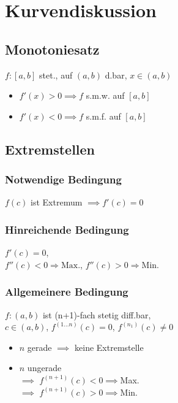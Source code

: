 \section*{Kurvendiskussion}

\subsection*{Monotoniesatz}
$f: [a,b]$ stet., auf $(a,b)$ d.bar, $x\in(a,b)$
\begin{itemize}
	\item $f'(x)>0\implies f$ s.m.w. auf $[a,b]$
	\item $f'(x)<0\implies f$ s.m.f. auf $[a,b]$
\end{itemize}

\subsection*{Extremstellen}

\subsubsection*{Notwendige Bedingung}
$f(c)$ ist Extremum $\implies f'(c)=0$

\subsubsection*{Hinreichende Bedingung}
$f'(c)=0$,\\
$f''(c)<0\Rightarrow\text{Max.}$, $f''(c)>0\Rightarrow\text{Min.}$

\subsubsection*{Allgemeinere Bedingung}
$f:(a,b)$ ist (n+1)-fach stetig diff.bar, \\
$c\in(a,b)$, $f^{(1 \ldots n)}(c)=0$, $f^{(n_1)}(c)\neq0$
\begin{itemize}
	\item $n$ gerade $\implies$ keine Extremstelle
	\item $n$ ungerade\\
		$\implies$ $f^{(n+1)}(c)<0\implies$Max. \\
		$\implies$ $f^{(n+1)}(c)>0\implies$Min.
\end{itemize}
